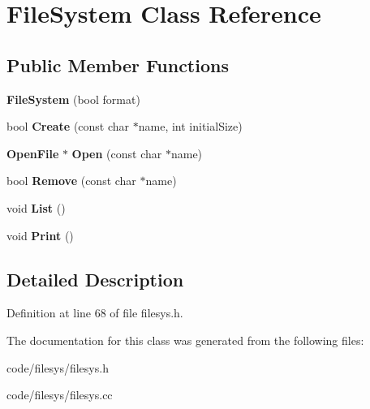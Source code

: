 \section{File\+System Class Reference}
\label{class_file_system}
\subsection*{Public Member Functions}
\begin{DoxyCompactItemize}
\item 
{\bfseries File\+System} (bool format)\label{class_file_system_a12d63294322b37e934edd03ff614b95a}

\item 
bool {\bfseries Create} (const char $\ast$name, int initial\+Size)\label{class_file_system_a4c6f94348b2f75db00ce11fe2c709b3b}

\item 
{\bf Open\+File} $\ast$ {\bfseries Open} (const char $\ast$name)\label{class_file_system_affae6d7e2deb69df4da1b7e2ccf340df}

\item 
bool {\bfseries Remove} (const char $\ast$name)\label{class_file_system_a65233243bc32e0cd14ff410e45358928}

\item 
void {\bfseries List} ()\label{class_file_system_aaf76918c6f0d24bc72aaa84625adfddf}

\item 
void {\bfseries Print} ()\label{class_file_system_aebaf06661b1879a62afefa5abe99f21e}

\end{DoxyCompactItemize}


\subsection{Detailed Description}


Definition at line 68 of file filesys.\+h.



The documentation for this class was generated from the following files\+:\begin{DoxyCompactItemize}
\item 
code/filesys/filesys.\+h\item 
code/filesys/filesys.\+cc\end{DoxyCompactItemize}
